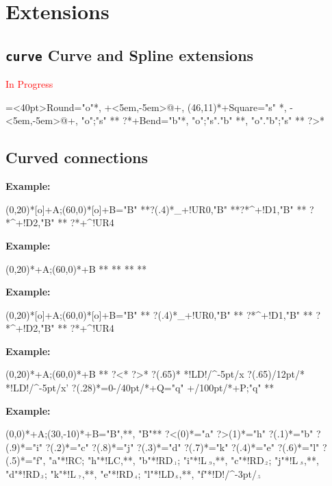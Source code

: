 \documentclass{article}
\newenvironment{code}{\par\noindent\textbf{Example:}\par\noindent}{}
\def\NotYet#1{\textcolor{red}{#1}}
\begin{document}
\section{Extensions}
\subsection{\texttt{curve} Curve and Spline extensions}
\NotYet{In Progress}
\def\lt{<}
\def\gt{>}

\xy *[o]=<40pt>\hbox{Round}="o"*,
+<5em,-5em>@+,
(46,11)*+\hbox{Square}="s" *\frm{-,},
-<5em,-5em>@+,
"o";"s" **{} ?*+\hbox{Bend}="b"*,
"o";"s"."b" **\crvs{-},
"o"."b";"s" **\crvs{-} ?>*\dir{>}
\endxy

\subsection{Curved connections}
\begin{code}
\xy (0,20)*[o]+{A};(60,0)*[o]+{B}="B" 
**\crv{}\POS?(.4)*_+!UR{0},"B" 
**\POS?*^+!D{1},"B"
** \POS?*^+!D{2},"B" 
**
\POS?*+^!UR{4} \endxy
\end{code}
\begin{code}
\xy (0,20)*+{A};(60,0)*+{B}
**\crv{}
**
**
**
\endxy
\end{code}
\begin{code}
\xy (0,20)*[o]+{A};(60,0)*[o]+{B}="B" 
**\crv{} \POS?(.4)*_+!UR{0},"B" 
** \POS?*^+!D{1},"B"
** \POS?*^+!D{2},"B" 
**
\POS?*+^!UR{4} \endxy
\end{code}
\begin{code}
\xy (0,20)*+{A};(60,0)*+{B}
**
 ?<*\dir{<} ?>*\dir{>}
 ?(.65)*{\oplus} *!LD!/^-5pt/{x}
 ?(.65)/12pt/*{\oplus} *!LD!/^-5pt/{x'}
 ?(.28)*=0{\otimes}-/40pt/*+{Q}="q"
 +/100pt/*+{P};"q" **\dir{-}
\endxy
\end{code}
\begin{code}
\def\ssz#1{\hbox{$_{^{#1}}$}}
\xy (0,0)*+{A};(30,-10)*+{B}="B",**\dir{-},
"B"**
 ?<(0)*\dir{<}="a" ?>(1)*\dir{>}="h"
 ?(.1)*\dir{<}="b" ?(.9)*\dir{>}="i"
 ?(.2)*\dir{<}="c" ?(.8)*\dir{>}="j"
 ?(.3)*\dir{<}="d" ?(.7)*\dir{>}="k"
 ?(.4)*\dir{<}="e" ?(.6)*\dir{>}="l"
 ?(.5)*\dir{|}="f",
 "a"*!RC\txt{\ssz{(\lt)}};
  "h"*!LC\txt{\ssz{\;(\gt)}},**,
 "b"*!RD{\ssz{.1}};
  "i"*!L{\ssz{\;.9}},**\dir{-},
 "c"*!RD{\ssz{.2}};
  "j"*!L{\ssz{\;.8}},**\dir{-},
 "d"*!RD{\ssz{.3}};
  "k"*!L{\ssz{\;.7}},**\dir{-},
 "e"*!RD{\ssz{.4}};
  "l"*!LD{\ssz{.6}},**\dir{-},
 "f"*!D!/^-3pt/{\ssz{.5}}
\endxy
\end{code}
\end{document}
